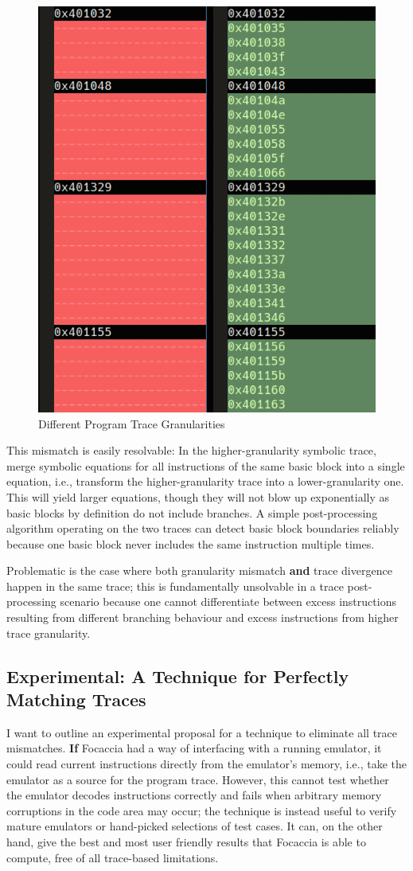 \begin{figure}[htpb]
    \centering
    \includegraphics[width=0.6\linewidth]{figures/trace_diff_view.png}
    \caption{Different Program Trace Granularities}\label{fig:trace_granularity}
\end{figure}

This mismatch is easily resolvable: In the higher-granularity symbolic trace, merge symbolic equations for all
instructions of the same basic block into a single equation, i.e., transform the higher-granularity trace into a
lower-granularity one. This will yield larger equations, though they will not blow up exponentially as basic blocks by
definition do not include branches. A simple post-processing algorithm operating on the two traces can detect basic
block boundaries reliably because one basic block never includes the same instruction multiple times.

Problematic is the case where both granularity mismatch \textbf{and} trace divergence happen in the same trace; this is
fundamentally unsolvable in a trace post-processing scenario because one cannot differentiate between excess
instructions resulting from different branching behaviour and excess instructions from higher trace granularity.

\subsection{Experimental: A Technique for Perfectly Matching Traces}\label{sec:experimental_trace_match}

I want to outline an experimental proposal for a technique to eliminate all trace mismatches. \textbf{If} Focaccia had a
way of interfacing with a running emulator, it could read current instructions directly from the emulator's memory,
i.e., take the emulator as a source for the program trace. However, this cannot test whether the emulator decodes
instructions correctly and fails when arbitrary memory corruptions in the code area may occur; the technique is instead
useful to verify mature emulators or hand-picked selections of test cases. It can, on the other hand, give the best and
most user friendly results that Focaccia is able to compute, free of all trace-based limitations.


